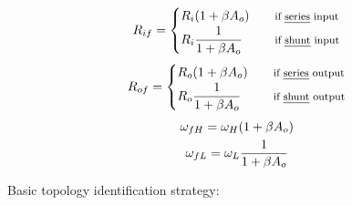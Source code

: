 \begin{CheatsheetEntryFrame}
\begin{minipage}[c]{0.73\textwidth}
    \end{minipage}

\end{CheatsheetEntryFrame}

\begin{CheatsheetEntryFrame}


    \begin{minipage}[c]{0.35\columnwidth}
        \MinipageInheritDocumentFormatting
        \begin{gather*}
            R_{if} =
                \begin{cases}
                    \displaystyle R_i (1 + \beta A_o)
                        & \quad \text{\footnotesize if \emph{series} input}
                        \\
                    \displaystyle R_i \frac{\mathstrut 1}{1 + \beta A_o}
                        & \quad \text{\footnotesize if \emph{shunt} input}
                \end{cases}
        \end{gather*}
        \begin{gather*}
            R_{of} =
                \begin{cases}
                    \displaystyle R_o (1 + \beta A_o)
                        & \quad \text{\footnotesize if \emph{series} output}
                        \\
                    \displaystyle R_o \frac{\mathstrut 1}{1 + \beta A_o}
                        & \quad \text{\footnotesize if \emph{shunt} output}
                \end{cases}
        \end{gather*}
        \begin{gather*}
            \omega_{fH} = \omega_H (1 + \beta A_o)
            \\
            \omega_{fL} = \omega_L \frac{1}{1 + \beta A_o}
        \end{gather*}
        \vspace*{0mm} %
    \end{minipage}%
    \SoftVLine{}%
    \begin{minipage}[c]{0.63\columnwidth}
        \MinipageInheritDocumentFormatting
        \footnotesize
        Basic topology identification strategy:

\end{minipage}
\end{CheatsheetEntryFrame}
